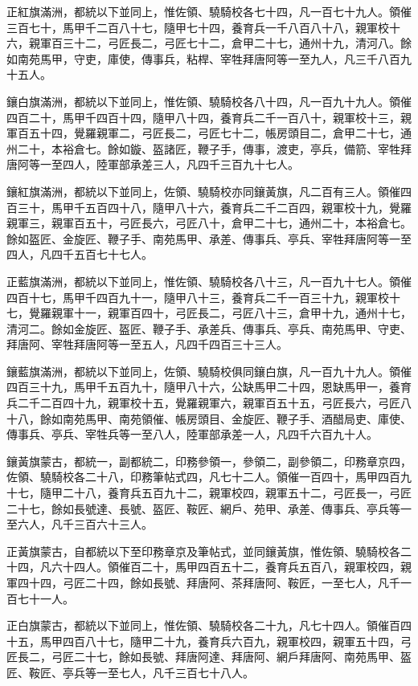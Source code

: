 \begin{pinyinscope}
正紅旗滿洲，都統以下並同上，惟佐領、驍騎校各七十四，凡一百七十九人。領催三百七十，馬甲千二百八十七，隨甲七十四，養育兵一千八百八十八，親軍校十六，親軍百三十二，弓匠長二，弓匠七十二，倉甲二十七，通州十九，清河八。餘如南苑馬甲，守吏，庫使，傳事兵，粘桿、宰牲拜唐阿等一至九人，凡三千八百九十五人。

鑲白旗滿洲，都統以下並同上，惟佐領、驍騎校各八十四，凡一百九十九人。領催四百二十，馬甲千四百十四，隨甲八十四，養育兵二千一百八十，親軍校十三，親軍百五十四，覺羅親軍二，弓匠長二，弓匠七十二，帳房頭目二，倉甲二十七，通州二十，本裕倉七。餘如鏇、盔諸匠，鞭子手，傳事，渡吏，亭兵，備箭、宰牲拜唐阿等一至四人，陸軍部承差三人，凡四千三百九十七人。

鑲紅旗滿洲，都統以下並同上，佐領、驍騎校亦同鑲黃旗，凡二百有三人。領催四百三十，馬甲千五百四十八，隨甲八十六，養育兵二千二百四，親軍校十九，覺羅親軍三，親軍百五十，弓匠長六，弓匠八十，倉甲二十七，通州二十，本裕倉七。餘如盔匠、金旋匠、鞭子手、南苑馬甲、承差、傳事兵、亭兵、宰牲拜唐阿等一至四人，凡四千五百七十七人。

正藍旗滿洲，都統以下並同上，惟佐領、驍騎校各八十三，凡一百九十七人。領催四百十七，馬甲千四百九十一，隨甲八十三，養育兵二千一百三十九，親軍校十七，覺羅親軍十一，親軍百四十，弓匠長二，弓匠八十三，倉甲十九，通州十七，清河二。餘如金旋匠、盔匠、鞭子手、承差兵、傳事兵、亭兵、南苑馬甲、守吏、拜唐阿、宰牲拜唐阿等一至五人，凡四千四百三十三人。

鑲藍旗滿洲，都統以下並同上，佐領、驍騎校俱同鑲白旗，凡一百九十九人。領催四百三十九，馬甲千五百九十，隨甲八十六，公缺馬甲二十四，恩缺馬甲一，養育兵二千二百四十九，親軍校十五，覺羅親軍六，親軍百五十五，弓匠長六，弓匠八十八，餘如南苑馬甲、南苑領催、帳房頭目、金旋匠、鞭子手、酒醋局吏、庫使、傳事兵、亭兵、宰牲兵等一至八人，陸軍部承差一人，凡四千六百九十人。

鑲黃旗蒙古，都統一，副都統二，印務參領一，參領二，副參領二，印務章京四，佐領、驍騎校各二十八，印務筆帖式四，凡七十二人。領催一百四十，馬甲四百九十七，隨甲二十八，養育兵五百九十二，親軍校四，親軍五十二，弓匠長一，弓匠二十七，餘如長號達、長號、盔匠、鞍匠、網戶、苑甲、承差、傳事兵、亭兵等一至六人，凡千三百六十三人。

正黃旗蒙古，自都統以下至印務章京及筆帖式，並同鑲黃旗，惟佐領、驍騎校各二十四，凡六十四人。領催百二十，馬甲四百五十二，養育兵五百八，親軍校四，親軍四十四，弓匠二十四，餘如長號、拜唐阿、茶拜唐阿、鞍匠，一至七人，凡千一百七十一人。

正白旗蒙古，都統以下並同上，惟佐領、驍騎校各二十九，凡七十四人。領催百四十五，馬甲四百八十七，隨甲二十九，養育兵六百九，親軍校四，親軍五十四，弓匠長二，弓匠二十七，餘如長號、拜唐阿達、拜唐阿、網戶拜唐阿、南苑馬甲、盔匠、鞍匠、亭兵等一至七人，凡千三百七十八人。


\end{pinyinscope}
